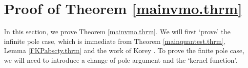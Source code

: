 \documentclass[11pt, a4paper,leqno]{amsart}
\theoremstyle{plain}
\newtheorem{theorem}[equation]{Theorem}
\theoremstyle{definition}
\theoremstyle{remark}
\numberwithin{equation}{section}
\newcommand{\rn}{\mathbb{R}^n}
\newcommand{\ree}{\mathbb{R}^{n+1}}
\newcommand{\hm}{\omega}
\def\div{\mathop{\operatorname{div}}\nolimits}
\newcommand{\simon}[1]{\marginpar{\scriptsize \textbf{Si:} #1}}
\begin{document}
\section{Proof of Theorem \ref{mainvmo.thrm}}\label{mtproof.sect}
In this section, we prove Theorem \ref{mainvmo.thrm}. We will first `prove' the infinite pole case, which is immediate from Theorem \ref{mainquantest.thrm}, Lemma \ref{FKPabscty.thrm} and the work of Korey \cite{Kor}. To prove the finite pole case, we will need to introduce a change of pole argument and the `kernel function'. 

\end{document}
